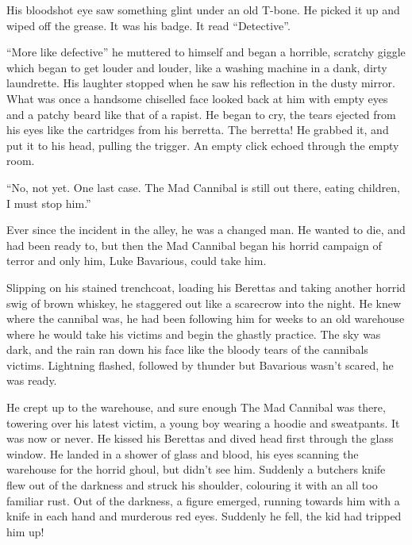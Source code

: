 His bloodshot eye saw something glint under an old T-bone. He
picked it up and wiped off the grease. It was his badge. It read
``Detective''.

``More like defective'' he muttered to himself and began
a horrible, scratchy giggle which began to get louder and louder,
like a washing machine in a dank, dirty laundrette. His laughter
stopped when he saw his reflection in the dusty mirror. What was
once a handsome chiselled face looked back at him with empty eyes
and a patchy beard like that of a rapist. He began to cry, the
tears ejected from his eyes like the cartridges from his berretta.
The berretta! He grabbed it, and put it to his head, pulling the
trigger. An empty click echoed through the empty room.



``No, not yet. One last case. The Mad Cannibal is still out
there, eating children, I must stop him.''



Ever since the incident in the alley, he was a changed man. He
wanted to die, and had been ready to, but then the Mad Cannibal
began his horrid campaign of terror and only him, Luke Bavarious,
could take him.



Slipping on his stained trenchcoat, loading his Berettas and taking
another horrid swig of brown whiskey, he staggered out like a
scarecrow into the night. He knew where the cannibal was, he had
been following him for weeks to an old warehouse where he would
take his victims and begin the ghastly practice. The sky was dark,
and the rain ran down his face like the bloody tears of the
cannibals victims. Lightning flashed, followed by thunder but
Bavarious wasn't scared, he was ready.



He crept up to the warehouse, and sure enough The Mad Cannibal was
there, towering over his latest victim, a young boy wearing a
hoodie and sweatpants. It was now or never. He kissed his Berettas
and dived head first through the glass window. He landed in a
shower of glass and blood, his eyes scanning the warehouse for the
horrid ghoul, but didn't see him. Suddenly a butchers knife
flew out of the darkness and struck his shoulder, colouring it with
an all too familiar rust. Out of the darkness, a figure emerged,
running towards him with a knife in each hand and murderous red
eyes. Suddenly he fell, the kid had tripped him up!



